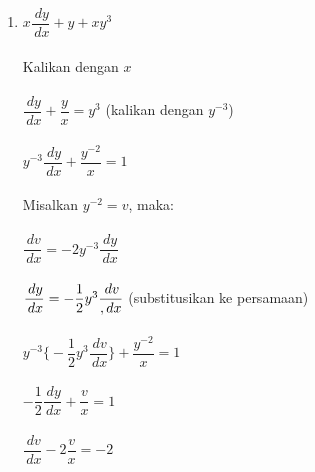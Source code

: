 \begin{enumerate}[1.]
	\item \begin{math} x \dfrac{\, dy}{\, dx} + y + xy^{3} \end{math} \\ \\
	Kalikan dengan \begin{math} x \end{math} \\ \\
	\begin{math}\dfrac{\, dy}{\, dx} + \dfrac{y}{x} = y^{3} \end{math} (kalikan dengan \begin{math} y^{-3} \end{math}) \\ \\
	\begin{math} y^{-3} \dfrac{\, dy}{\, dx} + \dfrac{y^{-2}}{x} = 1 \end{math} \\ \\
	Misalkan \begin{math} y^{-2} = v \end{math}, maka: \\ \\
	\begin{math} \dfrac{\, dv}{\, dx} = -2y^{-3} \dfrac{\, dy}{\, dx} \end{math} \\ \\
	\begin{math} \dfrac{\, dy}{\, dx} = -\dfrac{1}{2} y^{3} \dfrac{\, dv}{\\, dx} \end{math} (substitusikan ke persamaan)  \\ \\
	\begin{math} y^{-3} \bigg\{ -\dfrac{1}{2}y^{3} \dfrac{\, dv}{\, dx} \bigg\} + \dfrac{y^{-2}}{x} = 1 \end{math} \\ \\
	\begin{math} -\dfrac{1}{2} \dfrac{\, dy}{\, dx} + \dfrac{v}{x} = 1 \end{math} \\ \\
	\begin{math} \dfrac{\, dv}{\, dx} - 2 \dfrac{v}{x} = -2 \end{math} \\ \\

\end{enumerate}
